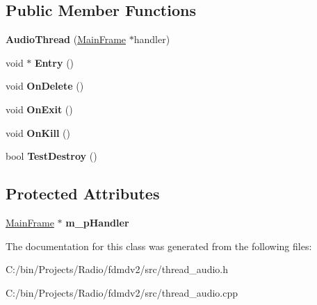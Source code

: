 \subsection*{Public Member Functions}
\begin{DoxyCompactItemize}
\item 
\hypertarget{class_audio_thread_a407b41c520dddd1cb0c6dc0f09b9997a}{{\bfseries Audio\-Thread} (\hyperlink{class_main_frame}{Main\-Frame} $\ast$handler)}\label{class_audio_thread_a407b41c520dddd1cb0c6dc0f09b9997a}

\item 
\hypertarget{class_audio_thread_a4a03b82bdfa0086232296cd8b4625339}{void $\ast$ {\bfseries Entry} ()}\label{class_audio_thread_a4a03b82bdfa0086232296cd8b4625339}

\item 
\hypertarget{class_audio_thread_afd0e99ebf3af9715130b1346c019857b}{void {\bfseries On\-Delete} ()}\label{class_audio_thread_afd0e99ebf3af9715130b1346c019857b}

\item 
\hypertarget{class_audio_thread_a21ea33ba8e28c461d631e0b2f458b36f}{void {\bfseries On\-Exit} ()}\label{class_audio_thread_a21ea33ba8e28c461d631e0b2f458b36f}

\item 
\hypertarget{class_audio_thread_a3c74246aef18af2461b2e8ac298a9db4}{void {\bfseries On\-Kill} ()}\label{class_audio_thread_a3c74246aef18af2461b2e8ac298a9db4}

\item 
\hypertarget{class_audio_thread_a0e2537aacda2facb464f64dad8e88372}{bool {\bfseries Test\-Destroy} ()}\label{class_audio_thread_a0e2537aacda2facb464f64dad8e88372}

\end{DoxyCompactItemize}
\subsection*{Protected Attributes}
\begin{DoxyCompactItemize}
\item 
\hypertarget{class_audio_thread_a5f8aabc9f6e28c833743c9715f3f2d79}{\hyperlink{class_main_frame}{Main\-Frame} $\ast$ {\bfseries m\-\_\-p\-Handler}}\label{class_audio_thread_a5f8aabc9f6e28c833743c9715f3f2d79}

\end{DoxyCompactItemize}


The documentation for this class was generated from the following files\-:\begin{DoxyCompactItemize}
\item 
C\-:/bin/\-Projects/\-Radio/fdmdv2/src/thread\-\_\-audio.\-h\item 
C\-:/bin/\-Projects/\-Radio/fdmdv2/src/thread\-\_\-audio.\-cpp\end{DoxyCompactItemize}
